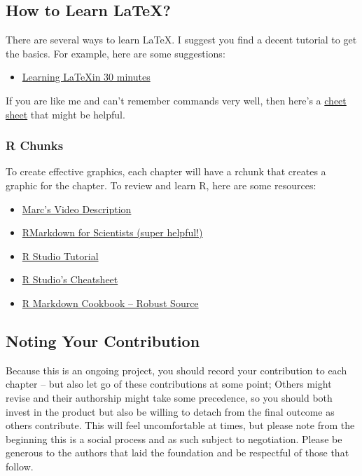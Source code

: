 \documentclass{book}\usepackage{knitr}
\begin{document}
\subsection*{How to Learn \LaTeX?}

There are several ways to learn \LaTeX. I suggest you find a decent tutorial to get the basics. For example, here are some suggestions:

\begin{itemize}
  \item \href{https://www.overleaf.com/learn/latex/Learn_LaTeX_in_30_minutes}{Learning \LaTeX in 30 minutes}
\end{itemize}

If you are like me and can't remember commands very well, then here's a \href{https://wch.github.io/latexsheet/latexsheet-0.png}{cheet sheet} that might be helpful. 

\subsubsection{R Chunks}

To create effective graphics, each chapter will have a rchunk that creates a graphic for the chapter. To review and learn R, here are some resources: 

\begin{itemize}
  \item \href{www.tbd.com}{Marc's Video Description}
  \item \href{https://rmd4sci.njtierney.com/}{RMarkdown for Scientists (super helpful!)}
  \item \href{https://rmarkdown.rstudio.com/lesson-1.html}{R Studio Tutorial}
  \item \href{https://rstudio.com/wp-content/uploads/2016/03/rmarkdown-cheatsheet-2.0.pdf?_ga=2.107420162.161662097.1613074083-214354297.1613074083}{R Studio's Cheatsheet}
  \item \href{https://bookdown.org/yihui/rmarkdown-cookbook}{R Markdown Cookbook -- Robust Source}
\end{itemize}


\subsection*{Noting Your Contribution}

Because this is an ongoing project, you should record your contribution to each chapter -- but also let go of these contributions at some point; Others might revise and their authorship might take some precedence, so you should both invest in the product but also be willing to detach from the final outcome as others contribute. This will feel uncomfortable at times, but please note from the beginning this is a social process and as such subject to negotiation. Please be generous to the authors that laid the foundation and be respectful of those that follow. 
\end{document}
